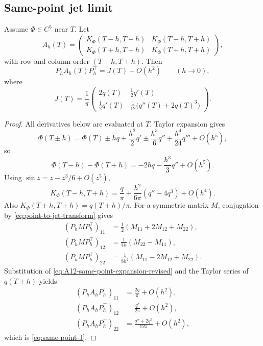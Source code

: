 \subsection{Same-point jet limit}
\label{subsec:same-point-jet-limit}

\begin{lemma}
\label{lem:same-point-jet-limit}
Assume \(\Phi\in C^5\) near \(T\).  Let
\[
A_h(T)=
\begin{pmatrix}
K_\Phi(T-h,T-h)&K_\Phi(T-h,T+h)\\
K_\Phi(T+h,T-h)&K_\Phi(T+h,T+h)
\end{pmatrix},
\]
with row and column order \((T-h,T+h)\).  Then
\[
        P_hA_h(T)P_h^\top = J(T)+O(h^2)\qquad (h\to0),
\]
where
\begin{equation}
\label{eq:same-point-J}
J(T)=\frac1\pi
\begin{pmatrix}
2q(T)&\tfrac12q'(T)\\[1ex]
\tfrac12q'(T)&\tfrac1{12}\bigl(q''(T)+2q(T)^3\bigr)
\end{pmatrix}.
\end{equation}
\end{lemma}

\begin{proof}
All derivatives below are evaluated at \(T\).  Taylor expansion gives
\[
\Phi(T\pm h)=\Phi(T)\pm hq+\frac{h^2}{2}q'
             \pm\frac{h^3}{6}q''+\frac{h^4}{24}q'''
             +O(h^5),
\]
so
\[
\Phi(T-h)-\Phi(T+h)=-2hq-\frac{h^3}{3}q''+O(h^5).
\]
Using \(\sin z=z-z^3/6+O(z^5)\),
\begin{equation}
\label{eq:A12-same-point-expansion-revised}
K_\Phi(T-h,T+h)
=\frac{q}{\pi}+\frac{h^2}{6\pi}(q''-4q^3)+O(h^4).
\end{equation}
Also \(K_\Phi(T\pm h,T\pm h)=q(T\pm h)/\pi\).  For a symmetric matrix
\(M\), conjugation by \eqref{eq:point-to-jet-transform} gives
\begin{align*}
(P_hMP_h^\top)_{11}&=\tfrac12(M_{11}+2M_{12}+M_{22}),\\
(P_hMP_h^\top)_{12}&=\tfrac1{4h}(M_{22}-M_{11}),\\
(P_hMP_h^\top)_{22}&=\tfrac1{8h^2}(M_{11}-2M_{12}+M_{22}).
\end{align*}
Substitution of \eqref{eq:A12-same-point-expansion-revised} and the Taylor
series of \(q(T\pm h)\) yields
\begin{align*}
(P_hA_hP_h^\top)_{11}
&=\frac{2q}{\pi}+O(h^2),\\
(P_hA_hP_h^\top)_{12}
&=\frac{q'}{2\pi}+O(h^2),\\
(P_hA_hP_h^\top)_{22}
&=\frac{q''+2q^3}{12\pi}+O(h^2),
\end{align*}
which is \eqref{eq:same-point-J}.
\end{proof}

